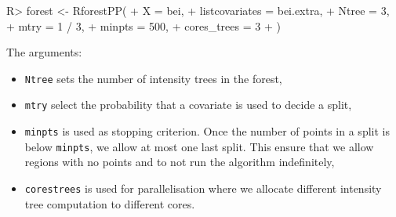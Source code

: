 \documentclass[11pt]{article}
\begin{document}
\begin{Schunk}
\begin{Sinput}
R> forest <- RforestPP(
+    X = bei,
+    listcovariates = bei.extra,
+    Ntree = 3,
+    mtry = 1 / 3,
+    minpts = 500,
+    cores_trees = 3
+  )
\end{Sinput}
\end{Schunk}

The arguments: 
\begin{itemize}
  \item \texttt{Ntree} sets the number of intensity trees in the forest,
  \item \texttt{mtry} select the probability that a covariate is used to decide 
  a split,
  \item \texttt{minpts} is used as stopping criterion. Once the number of points 
  in a split is below \texttt{minpts}, we allow at most one last split. 
  This ensure that we allow regions with no points and 
  to not run the algorithm indefinitely,
  \item \texttt{cores{\textunderscore}trees} is used for parallelisation 
  where we allocate different intensity tree computation to different cores. 
\end{itemize}
\end{document}
